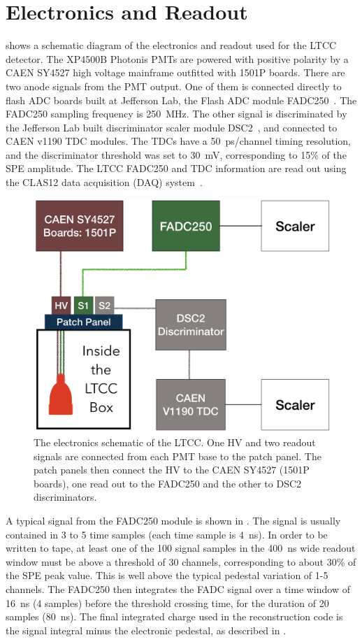 \section{Electronics and Readout}

 shows a schematic diagram of the electronics and readout used for the LTCC
detector. The XP4500B Photonis PMTs are powered with positive polarity by a CAEN SY4527 high voltage
mainframe outfitted with 1501P boards. There are two anode signals from the PMT output. One of them is
connected directly to flash ADC boards built at Jefferson Lab, the Flash ADC module FADC250~\cite{daq-nim}.
The FADC250 sampling frequency is 250~MHz. The other signal is discriminated by the Jefferson Lab built
discriminator scaler module DSC2~\cite{daq-nim}, and connected to CAEN v1190 TDC modules. The TDCs have a
50~ps/channel timing resolution, and the discriminator threshold was set to 30~mV, corresponding to 15\% of the
SPE amplitude. The LTCC FADC250 and TDC information are read out using the CLAS12 data acquisition (DAQ)
system~\cite{daq-nim}.

\begin{figure}
	\centering
	\includegraphics[width=0.99\columnwidth, height=0.6\columnwidth]{img/electronicScheme.png}
	\caption{The electronics schematic of the LTCC. One HV and two readout signals are connected from each PMT
          base to the patch panel. The patch panels then connect the HV to the CAEN SY4527 (1501P boards), one read
          out to the FADC250 and the other to DSC2 discriminators.}
	\label{fig:electronicScheme}
\end{figure}

A typical signal from the FADC250 module is shown in . The signal is usually contained in 3 to 5 time samples
(each time sample is 4~ns). In order to be written to tape, at least one of the 100 signal samples in the 400~ns
wide readout window must be above a threshold of 30 channels, corresponding to about 30\% of the SPE peak value.
This is well above the typical pedestal variation of 1-5 channels. The FADC250 then integrates the FADC signal over
a time window of 16~ns (4 samples) before the threshold crossing time, for the duration of 20 samples (80~ns). The
final integrated charge used in the reconstruction code is the signal integral minus the electronic pedestal, as
described in .

